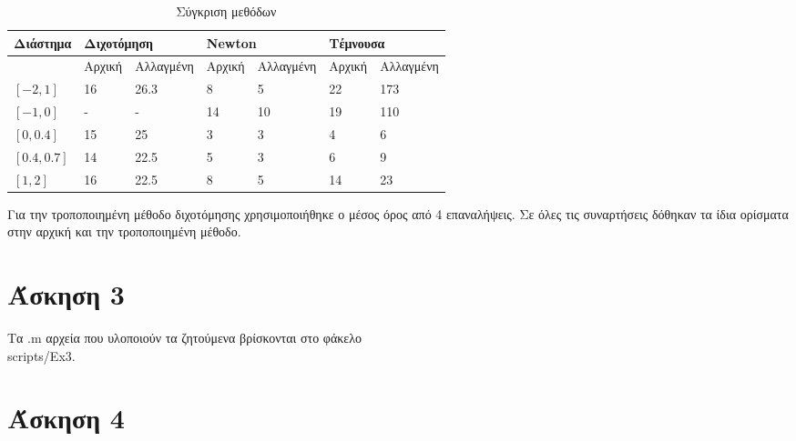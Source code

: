 \documentclass[12pt,a4paper]{article}
\begin{document}
    \begin{table}[hb]
        \centering
        \setlength\tabcolsep{1.8pt}
        \begin{tabular}{|l|l|l|l|l|l|l|}
        \hline
        Διάστημα    & \multicolumn{2}{l|}{Διχοτόμηση} & \multicolumn{2}{l|}{Newton} & \multicolumn{2}{l|}{Tέμνουσα} \\ \hline
                    & Αρχική        & Αλλαγμένη       & Αρχική      & Αλλαγμένη     & Αρχική       & Αλλαγμένη      \\ \hline
        $[-2,1]$    & 16            & 26.3            & 8           & 5             & 22           & 173            \\ \hline
        $[-1,0]$    & -             & -               & 14          & 10            & 19           & 110            \\ \hline
        $[0,0.4]$   & 15            & 25              & 3           & 3             & 4            & 6              \\ \hline
        $[0.4,0.7]$ & 14            & 22.5            & 5           & 3             & 6            & 9              \\ \hline
        $[1,2]$     & 16            & 22.5            & 8           & 5             & 14           & 23             \\ \hline
        \end{tabular}
        \caption{Σύγκριση μεθόδων}
        \label{tab:method-comparison}
    \end{table}
    Για την τροποποιημένη μέθοδο διχοτόμησης χρησιμοποιήθηκε ο μέσος όρος από 4 επαναλήψεις. Σε όλες τις συναρτήσεις δόθηκαν τα ίδια ορίσματα 
    στην αρχική και την τροποποιημένη μέθοδο.

    \section{Άσκηση 3}
    Τα .m αρχεία που υλοποιούν τα ζητούμενα βρίσκονται στο φάκελο \\ scripts/Ex3.

    \section{Άσκηση 4}
\end{document}
